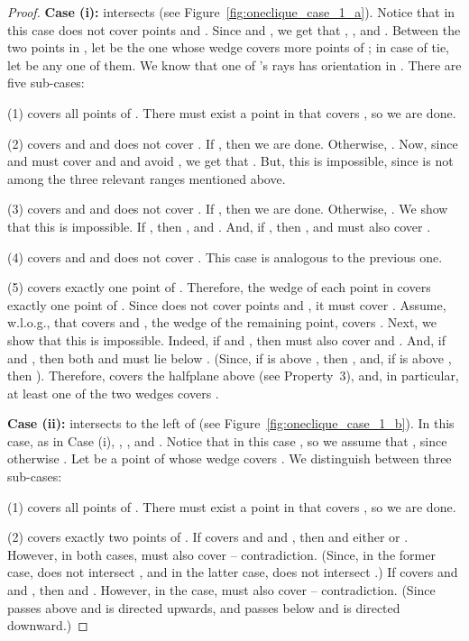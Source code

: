 \documentclass[11pt]{article}
\newcommand{\old}[1]{{{}}}
\begin{document}
{\begin{proof}
{\bf Case (i):}  intersects  (see Figure~\ref{fig:oneclique_case_1_a}). Notice that in this case  does not cover points  and . Since  and , we get that , , and
.
Between the two points in , let  be the one whose wedge covers more points of ; in case of tie, let  be any one of them. We know that one of 's rays has orientation in .
There are five sub-cases:

(1)  covers all points of . There must exist a point in  that covers , so we are done. 

(2)  covers  and  and does not cover . If , then we are done. Otherwise, . Now, since  and  must cover  and  and avoid , we get that . But, this is impossible, since  is not among the three relevant ranges mentioned above. 

(3)  covers  and  and does not cover . If , then we are done. Otherwise, . We show that this is impossible.
If , then , and . And, if , then , and  must also cover .

(4)  covers  and  and does not cover . This case is analogous to the previous one.
\old{FULL VERSION
If , then we are done. Otherwise, .
We show that this is impossible.
If  , then , and . And, if , then , and  must also cover .
}

(5)  covers exactly one point of . Therefore, the wedge of each point in  covers exactly one point of . Since  does not cover points  and , it must cover .
Assume, w.l.o.g., that  covers  and , the wedge of the remaining point, covers . Next, we show that this is impossible.
Indeed, if  and , then  must also cover  and . 
And, if  and , then both  and  must lie below . (Since, if  is above , then , and, if  is above , then ). Therefore,  covers the halfplane above  (see Property~3), and, in particular, at least one of the two wedges covers .



{\bf Case (ii):}  intersects  to the left of  (see Figure~\ref{fig:oneclique_case_1_b}). In this case, as in Case (i), , , and
. Notice that in this case , so we assume that
, since otherwise . Let  be a point of  whose wedge covers
. We distinguish between three sub-cases:

(1)  covers all points of . There must exist a point in  that covers , so we are done.

(2)  covers exactly two points of . If  covers  and  and , then  and either  or .
However, in both cases,  must also cover  -- contradiction. (Since, in the former case,  does not intersect , and in the latter case,  does not intersect .) If  covers  and  and , then  and . However, in the case,  must also cover  -- contradiction. (Since  passes above  and is directed upwards, and  passes below  and is directed downward.)


\end{proof}}
\end{document}
